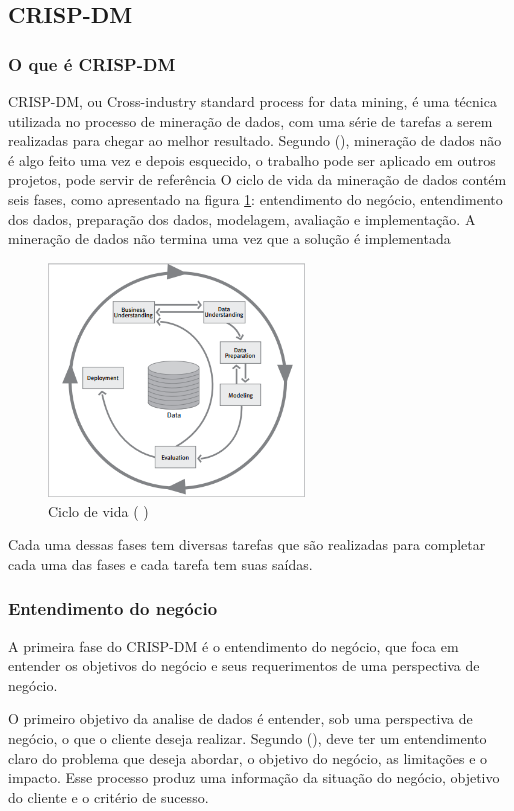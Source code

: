 \subsection{CRISP-DM}
\subsubsection{O que é CRISP-DM}
CRISP-DM, ou Cross-industry standard process for data mining, é uma técnica utilizada no processo de mineração de dados, com uma série de tarefas a serem realizadas para chegar ao melhor resultado.
Segundo \citeauthor{dmfd} (\citeyear{dmfd}), mineração de dados não é algo feito uma vez e depois esquecido, o trabalho pode ser aplicado em outros projetos, pode servir de referência
O ciclo de vida da mineração de dados contém seis fases, como apresentado na figura \ref{crispcycle}: entendimento do negócio, entendimento dos dados, preparação dos dados, modelagem, avaliação e implementação. 
A mineração de dados não termina uma vez que a solução é implementada \citep{crispmanual}
\begin{figure}[H]
\centering
\includegraphics[height=6.2cm]{imagens/lifecycle.png}
\caption{Ciclo de vida (\citeauthor{crispmanual} \citeyear{crispmanual})}
\label{crispcycle}
\end{figure}
Cada uma dessas fases tem diversas tarefas que são realizadas para completar cada uma das fases e cada tarefa tem suas saídas.
\subsubsection{Entendimento do negócio}
A primeira fase do CRISP-DM é o entendimento do negócio, que foca em entender os objetivos do negócio e seus requerimentos de uma perspectiva de negócio.

O primeiro objetivo da analise de dados é entender, sob uma perspectiva de negócio, o que o cliente deseja realizar. Segundo \citeauthor{dmfd} (\citeyear{dmfd}), deve ter um entendimento claro do problema que deseja abordar, o objetivo do negócio, as limitações e o impacto. Esse processo produz uma informação da situação do negócio, objetivo do cliente e o critério de sucesso.

